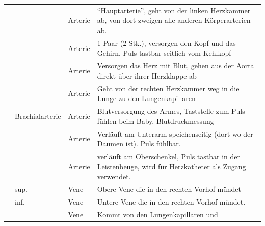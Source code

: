 {\noindent\begin{tabulary}{\linewidth}{lllL}
\addlinespace\toprule\addlinespace
\noindent{}
&
\noindent{}
&
\noindent{}
&
\noindent{}
\\\midrule\addlinespace
{} 
&
 
&
Arterie
&
\protect\enquote{Hauptarterie}, geht von der linken
Herzkammer ab, von dort zweigen alle
anderen Körperarterien ab.
\\\addlinespace
{} 
&
 
&
Arterie
&
1 Paar (2 Stk.), versorgen den Kopf und das Gehirn, Puls tastbar seitlich vom
Kehlkopf
\\\addlinespace
{} 
&
 
&
Arterie
&
Versorgen das Herz mit Blut, gehen aus der Aorta direkt über ihrer Herzklappe ab
\\\addlinespace
{} 
&
 
&
Arterie
&
\noindent{} Geht von der rechten Herzkammer weg in
die Lunge zu den Lungenkapillaren
\\\addlinespace
{} 
&
Brachialarterie
&
Arterie
&
Blutversorgung des Armes, Taststelle zum Puls-fühlen beim Baby, Blutdruckmessung
\\\addlinespace
{} 
&
&
Arterie
&
Verläuft am Unterarm speichenseitig (dort wo der Daumen ist). Puls
fühlbar.
\\\addlinespace
{} 
&
 
&
Arterie
&
verläuft am Oberschenkel, Puls tastbar in der Leistenbeuge, wird für
Herzkatheter als Zugang verwendet. 
\\\addlinespace
{} 
&
 sup. 
&
Vene
&
Obere Vene die in den rechten Vorhof mündet
\\\addlinespace
{}
&
 inf. 
&
Vene
&
Untere Vene die in den rechten Vorhof mündet.
\\\addlinespace
{} 
&
 
&
Vene
&
 Kommt von den Lungenkapillaren und

\end{tabulary}}
